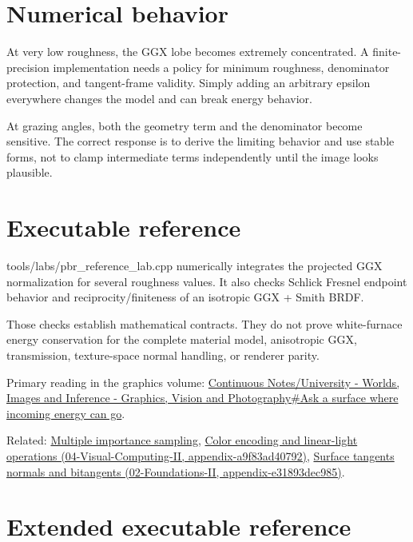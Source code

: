 \section{Numerical behavior}\label{appendix-885c1cb64ae9-numerical-behavior}

At very low roughness, the GGX lobe becomes extremely concentrated. A finite-precision implementation needs a policy for minimum roughness, denominator protection, and tangent-frame validity. Simply adding an arbitrary epsilon everywhere changes the model and can break energy behavior.

At grazing angles, both the geometry term and the denominator become sensitive. The correct response is to derive the limiting behavior and use stable forms, not to clamp intermediate terms independently until the image looks plausible.

\section{Executable reference}\label{appendix-885c1cb64ae9-executable-reference}

tools/labs/pbr\_reference\_lab.cpp numerically integrates the projected GGX normalization for several roughness values. It also checks Schlick Fresnel endpoint behavior and reciprocity/finiteness of an isotropic GGX + Smith BRDF.

Those checks establish mathematical contracts. They do not prove white-furnace energy conservation for the complete material model, anisotropic GGX, transmission, texture-space normal handling, or renderer parity.

Primary reading in the graphics volume: \href{Continuous\%20Notes/University\%20-\%20Worlds,\%20Images\%20and\%20Inference\%20-\%20Graphics,\%20Vision\%20and\%20Photography\#Ask\%20a\%20surface\%20where\%20incoming\%20energy\%20can\%20go}{Continuous Notes/University - Worlds, Images and Inference - Graphics, Vision and Photography\#Ask a surface where incoming energy can go}.

Related: \hyperref[appendix-ca8898faf1a6]{Multiple importance sampling}, \href{../04-Visual-Computing-II/main.pdf\#nameddest=appendix-a9f83ad40792}{Color encoding and linear-light operations (04-Visual-Computing-II, appendix-a9f83ad40792)}, \href{../02-Foundations-II/main.pdf\#nameddest=appendix-e31893dec985}{Surface tangents normals and bitangents (02-Foundations-II, appendix-e31893dec985)}.

\section{Extended executable reference}\label{appendix-885c1cb64ae9-extended-executable-reference}

